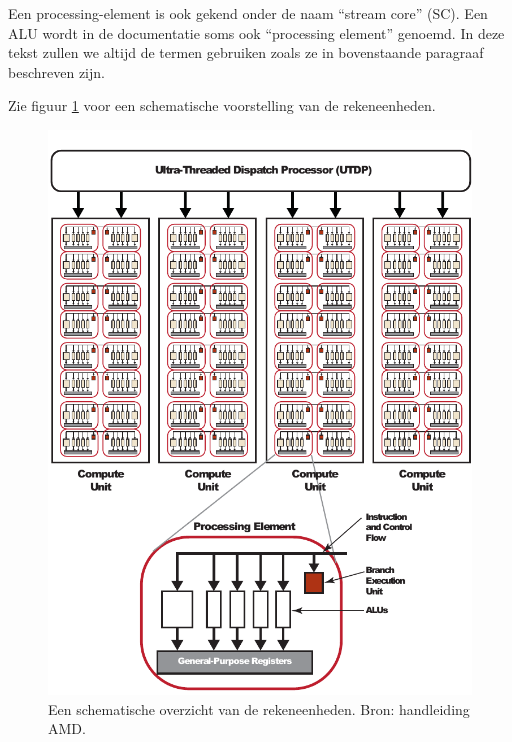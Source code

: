 Een processing-element is ook gekend onder de naam ``stream core'' (SC). Een ALU wordt in de documentatie soms ook ``processing element'' genoemd. In deze tekst zullen we altijd de termen gebruiken zoals ze in bovenstaande paragraaf beschreven zijn.

Zie figuur \ref{alu} voor een schematische voorstelling van de rekeneenheden.

\begin{figure}[h]
\centering
\includegraphics{alu}
\caption{\label{alu}Een schematische overzicht van de rekeneenheden. Bron: handleiding AMD\cite[p.~1-5]{amd}.}
\end{figure}




